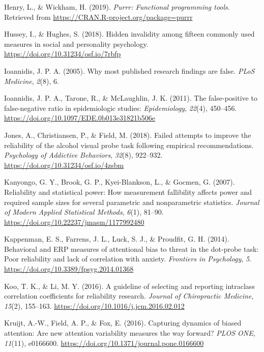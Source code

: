 \documentclass[english,,man,floatsintext]{apa6}
\begin{document}
\leavevmode\hypertarget{ref-R-purrr}{}%
Henry, L., \& Wickham, H. (2019). \emph{Purrr: Functional programming tools}. Retrieved from \url{https://CRAN.R-project.org/package=purrr}

\leavevmode\hypertarget{ref-hussey_hidden_2018}{}%
Hussey, I., \& Hughes, S. (2018). Hidden invalidity among fifteen commonly used measures in social and personality psychology. \url{https://doi.org/10.31234/osf.io/7rbfp}

\leavevmode\hypertarget{ref-ioannidis_why_2005}{}%
Ioannidis, J. P. A. (2005). Why most published research findings are false. \emph{PLoS Medicine}, \emph{2}(8), 6.

\leavevmode\hypertarget{ref-ioannidis_false-positive_2011}{}%
Ioannidis, J. P. A., Tarone, R., \& McLaughlin, J. K. (2011). The false-positive to false-negative ratio in epidemiologic studies: \emph{Epidemiology}, \emph{22}(4), 450--456. \url{https://doi.org/10.1097/EDE.0b013e31821b506e}

\leavevmode\hypertarget{ref-jones_failed_2018}{}%
Jones, A., Christiansen, P., \& Field, M. (2018). Failed attempts to improve the reliability of the alcohol visual probe task following empirical recommendations. \emph{Psychology of Addictive Behaviors}, \emph{32}(8), 922--932. \url{https://doi.org/10.31234/osf.io/4zsbm}

\leavevmode\hypertarget{ref-kanyongo_reliability_2007}{}%
Kanyongo, G. Y., Brook, G. P., Kyei-Blankson, L., \& Gocmen, G. (2007). Reliability and statistical power: How measurement fallibility affects power and required sample sizes for several parametric and nonparametric statistics. \emph{Journal of Modern Applied Statistical Methods}, \emph{6}(1), 81--90. \url{https://doi.org/10.22237/jmasm/1177992480}

\leavevmode\hypertarget{ref-kappenman_behavioral_2014}{}%
Kappenman, E. S., Farrens, J. L., Luck, S. J., \& Proudfit, G. H. (2014). Behavioral and ERP measures of attentional bias to threat in the dot-probe task: Poor reliability and lack of correlation with anxiety. \emph{Frontiers in Psychology}, \emph{5}. \url{https://doi.org/10.3389/fpsyg.2014.01368}

\leavevmode\hypertarget{ref-koo_guideline_2016}{}%
Koo, T. K., \& Li, M. Y. (2016). A guideline of selecting and reporting intraclass correlation coefficients for reliability research. \emph{Journal of Chiropractic Medicine}, \emph{15}(2), 155--163. \url{https://doi.org/10.1016/j.jcm.2016.02.012}

\leavevmode\hypertarget{ref-kruijt_capturing_2016}{}%
Kruijt, A.-W., Field, A. P., \& Fox, E. (2016). Capturing dynamics of biased attention: Are new attention variability measures the way forward? \emph{PLOS ONE}, \emph{11}(11), e0166600. \url{https://doi.org/10.1371/journal.pone.0166600}
\end{document}
